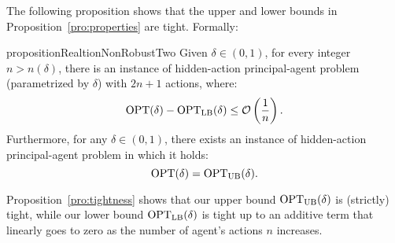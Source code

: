 The following proposition shows that the upper and lower bounds in Proposition~\ref{pro:properties} are tight. Formally:
%
\begin{restatable}{proposition}{RealtionNonRobustTwo}\label{pro:tightness}
	Given $\delta \in (0,1)$, for every integer $n > n(\delta)$, there is an instance of hidden-action principal-agent problem (parametrized by $\delta$) with $2n + 1$ actions, where:
	\begin{equation*}
		\textnormal{OPT}(\delta) -\textnormal{OPT}_{\textnormal{LB}}(\delta) \le \mathcal{O}\left(\frac{1}{n}\right).
	\end{equation*}
	Furthermore, for any $\delta\in(0,1)$, there exists an instance of hidden-action principal-agent problem in which it holds: $$\textnormal{OPT}(\delta)= \textnormal{OPT}_{\textnormal{UB}}(\delta).$$
\end{restatable}



% 
%
%
Proposition~\ref{pro:tightness} shows that our upper bound $\textnormal{OPT}_{\textnormal{UB}}(\delta)$ is (strictly) tight, while our lower bound $\textnormal{OPT}_{\textnormal{LB}}(\delta)$ is tight up to an additive term that linearly goes to zero as the number of agent's actions $n$ increases.



